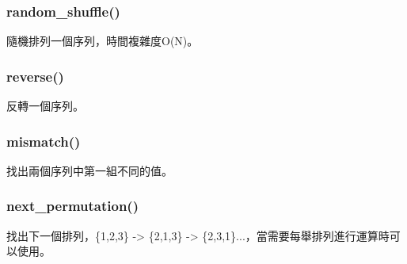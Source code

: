 \documentclass{article}
\begin{document}
\subsubsection{random\_shuffle()}
隨機排列一個序列，時間複雜度O(N)。
\subsubsection{reverse()}
反轉一個序列。
\subsubsection{mismatch()}
找出兩個序列中第一組不同的值。
\subsubsection{next\_permutation()}
找出下一個排列，\{1,2,3\} -> \{2,1,3\} -> \{2,3,1\}...，當需要每舉排列進行運算時可以使用。
\end{document}
